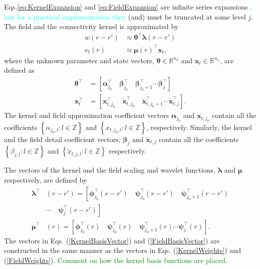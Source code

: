 \documentclass[journal,a4paper]{IEEEtran}
\newcommand{\dean}[1]{\textcolor{green}{#1}}
\newcommand{\cut}[1]{\textcolor{cyan}{#1}}
\begin{document}
Eqs.\eqref{eq:KernelExpansion} and \eqref{eq:FieldExpansion} are infinite series expansions \cut{, but  for a practical implementation they } (and) must be truncated at some level $j$. The field and the connectivity kernel is approximated by
\begin{align}
	w\left(r-r'\right) &\approx \boldsymbol\theta^\top\boldsymbol\lambda\left(r-r'\right) 
	\label{eq:KernelFiniteExpansion} \\
	v_t\left(r\right) &\approx \boldsymbol\mu\left(r\right)^\top\mathbf{x}_t,
	\label{eq:FieldFiniteExpansion}
\end{align}
where the unknown parameter and state vectors, $\boldsymbol\theta \in \mathbb{R}^{n_{\theta}}$ and $\mathbf{x}_t \in \mathbb{R}^{n_x}$, are defined as 
\begin{align}
\boldsymbol\theta^\top &=\left[ \boldsymbol\alpha_{j_0}^\top \quad \boldsymbol\beta_{j_0}^\top \quad \boldsymbol\beta_{j_0+1}^\top \cdots \boldsymbol\beta_{j}^\top\right] 
\label{KernelWeights} \\
\mathbf{x}_{t}^\top &=\left[\mathbf{x}_{t,j_{0}}^\top \quad  \check{\mathbf{x}}_{t,j_{0}}^\top \quad  \check{\mathbf{x}}_{t,j_{0}+1}^\top \cdots \check{\mathbf{x}}_{t,j}^\top\right].
\label{FieldWeights}
\end{align}
The kernel and field approximation coefficient vectors $\boldsymbol \alpha_{j_0}$ and $\mathbf{x}_{t,j_{0}}$ contain all the coefficients $\left\lbrace\alpha_{j_0, l}:l \in \mathbb{Z} \right\rbrace $ and $\left\lbrace x_{t,j_0, l}: l \in \mathbb{Z}\right\rbrace$, respectively. Similarly, the kernel and the field detail coefficient vectors, $\boldsymbol\beta_{j}$ and $\check{\mathbf{x}}_{t,j}$ contain all the coefficients $\left\lbrace \beta_{j,l} :l \in \mathbb{Z}\right\rbrace$ and $\left\lbrace  \check x_{t,j, l}:l \in \mathbb{Z}\right\rbrace$ respectively.

The vectors of the kernel and the field scaling and wavelet functions, $\boldsymbol\lambda$ and $\boldsymbol\mu$ respectively, are defined by
\begin{align}
 \boldsymbol\lambda^\top & (r-r')=\left[ \boldsymbol\phi_{j_0}^\top(r-r') \quad \boldsymbol\psi_{j_0}^\top(r-r') \quad \boldsymbol\psi_{j_0+1}^\top(r-r') \right. \nonumber \\
&\left. \cdots \quad \boldsymbol\psi_{j}^\top(r-r')\right] \label{KernelBasisVector} \\
 \boldsymbol\mu^\top & (r)=\left[ \boldsymbol\phi_{j_0}^\top(r) \quad \boldsymbol\psi_{j_0}^\top(r) \quad \boldsymbol\psi_{j_0+1}^\top(r) \cdots \boldsymbol\psi_{j}^\top(r) \right]. 
\label{FieldBasisVector}
\end{align}
The vectors in Eqs. (\ref{KernelBasisVector}) and (\ref{FieldBasisVector}) are constructed in the same manner as the vectors in Eqs. (\ref{KernelWeights}) and (\ref{FieldWeights}). \dean{Comment on how the kernel basis functions are placed.}
 
\end{document}
